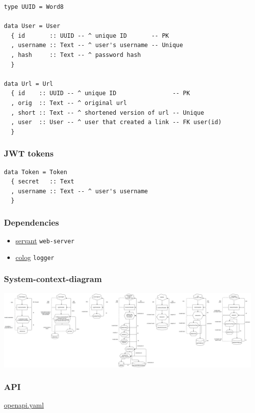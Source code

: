 \documentclass[11pt]{article}
\begin{document}
\begin{verbatim}
type UUID = Word8

data User = User
  { id       :: UUID -- ^ unique ID       -- PK
  , username :: Text -- ^ user's username -- Unique
  , hash     :: Text -- ^ password hash
  }

data Url = Url
  { id    :: UUID -- ^ unique ID                -- PK
  , orig  :: Text -- ^ original url
  , short :: Text -- ^ shortened version of url -- Unique
  , user  :: User -- ^ user that created a link -- FK user(id)
  }
\end{verbatim}

\subsubsection{JWT tokens}
\label{sec:org581c543}
\begin{verbatim}
data Token = Token
  { secret   :: Text
  , username :: Text -- ^ user's username
  }
\end{verbatim}

\subsubsection{Dependencies}
\label{sec:org313cd36}
\begin{itemize}
\item \uline{servant} \texttt{web-server}
\item \uline{colog}   \texttt{logger}
\end{itemize}

\subsubsection{System-context-diagram}
\label{sec:org9d24d86}
\begin{center}
\includegraphics[width=.9\linewidth]{arch.png}
\end{center}

\subsubsection{API}
\label{sec:org776736a}
\url{openapi.yaml}
\end{document}
